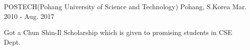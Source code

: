 

\begin{cventries}

	{POSTECH(Pohang University of Science and Technology)} %
	{Pohang, S.Korea} %
	{Mar. 2010 - Aug. 2017} %
	{
		\begin{cvitems} %
			\item {Got a Chun Shin-Il Scholarship which is given to promising students in CSE Dept.}
		\end{cvitems}
	}

\end{cventries}
